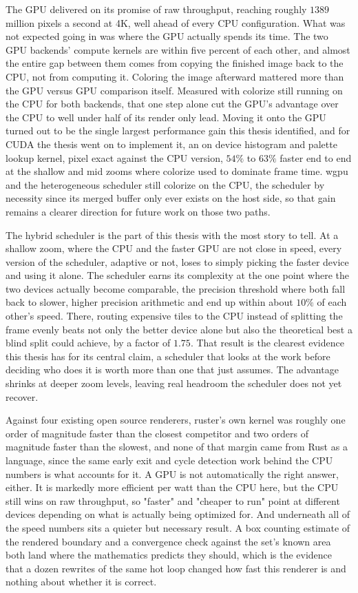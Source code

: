 \documentclass{ftndiplomski}
\begin{document}
The GPU delivered on its promise of raw throughput, reaching roughly
$1389$ million pixels a second at 4K, well ahead of every CPU
configuration. What was not expected going in was where the GPU actually
spends its time. The two GPU backends' compute kernels are within five
percent of each other, and almost the entire gap between them comes from
copying the finished image back to the CPU, not from computing it.
Coloring the image afterward mattered more than the GPU versus GPU
comparison itself. Measured with colorize still running on the CPU for
both backends, that one step alone cut the GPU's advantage over the CPU
to well under half of its render only lead. Moving it onto the GPU turned
out to be the single largest performance gain this thesis identified, and
for CUDA the thesis went on to implement it, an on device histogram and
palette lookup kernel, pixel exact against the CPU version, $54\%$ to
$63\%$ faster end to end at the shallow and mid zooms where colorize
used to dominate frame time. wgpu and the heterogeneous scheduler still
colorize on the CPU, the scheduler by necessity since its merged buffer
only ever exists on the host side, so that gain remains a clearer
direction for future work on those two paths.

The hybrid scheduler is the part of this thesis with the most story to
tell. At a shallow zoom, where the CPU and the faster GPU are not close
in speed, every version of the scheduler, adaptive or not, loses to
simply picking the faster device and using it alone. The scheduler earns
its complexity at the one point where the two devices actually become
comparable, the precision threshold where both fall back to slower,
higher precision arithmetic and end up within about $10\%$ of each
other's speed. There, routing expensive tiles to the CPU instead of
splitting the frame evenly beats not only the better device alone but
also the theoretical best a blind split could achieve, by a factor of
$1.75$. That result is the clearest evidence this thesis has for its
central claim, a scheduler that looks at the work before deciding who
does it is worth more than one that just assumes. The advantage shrinks
at deeper zoom levels, leaving real headroom the scheduler does not yet
recover.

Against four existing open source renderers, ruster's own kernel was
roughly one order of magnitude faster than the closest competitor and two
orders of magnitude faster than the slowest, and none of that margin came
from Rust as a language, since the same early exit and cycle detection
work behind the CPU numbers is what accounts for it. A GPU is not
automatically the right answer, either. It is markedly more efficient
per watt than the CPU here, but the CPU still wins on raw throughput,
so "faster" and "cheaper to run" point at different devices depending on
what is actually being optimized for. And underneath all of the speed
numbers sits a quieter but necessary result. A box counting estimate of
the rendered boundary and a convergence check against the set's known
area both land where the mathematics predicts they should, which is the
evidence that a dozen rewrites of the same hot loop changed how fast this
renderer is and nothing about whether it is correct.
\end{document}
